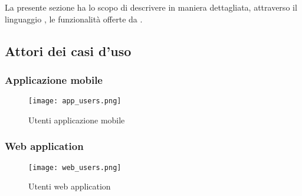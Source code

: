 \documentclass[../analisi-dei-requisiti.tex]{subfiles}
\begin{document}
La presente sezione ha lo scopo di descrivere in maniera dettagliata, attraverso il linguaggio , le funzionalità offerte da .

\subsection{Attori dei casi d'uso}%
\label{sub:attori_casi_duso}

\subsubsection{Applicazione mobile}%
\label{subs:mobile_app}

\begin{figure}[H]
  \centering
  \texttt{[image: app\_users.png]}
  \caption{Utenti applicazione mobile}%
  \label{fig:usersapp}
\end{figure}

\subsubsection{Web application}%
\label{subs:web_application}

\begin{figure}[H]
  \centering
  \texttt{[image: web\_users.png]}
  \caption{Utenti web application}%
  \label{fig:usersweb}
\end{figure}
\end{document}
